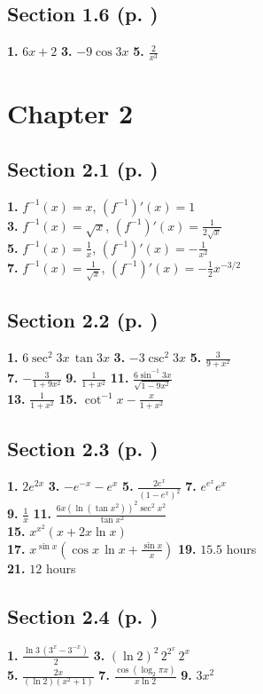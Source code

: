 \begin{multicols*}{2}
\subsection*{Section 1.6 (p. \pageref{sec1dot6})}
\textbf{1.} $6x+2$ \quad
\textbf{3.} $-9\cos 3x$ \quad
\textbf{5.} $\frac{2}{x^3}$
\section*{Chapter 2}
\subsection*{Section 2.1 (p. \pageref{sec2dot1})}
\textbf{1.} $f^{-1}(x)=x$, $\left(f^{-1}\right)'(x)=1$\\
\textbf{3.} $f^{-1}(x)=\sqrt{x}$, $\left(f^{-1}\right)'(x)=\frac{1}{2\sqrt{x}}$\\
\textbf{5.} $f^{-1}(x)=\frac{1}{x}$, $\left(f^{-1}\right)'(x)=-\frac{1}{x^2}$\\
\textbf{7.} $f^{-1}(x)=\frac{1}{\sqrt{x}}$, $\left(f^{-1}\right)'(x)=-\frac{1}{2}x^{-3/2}$
\subsection*{Section 2.2 (p. \pageref{sec2dot2})}
\textbf{1.} $6\sec^2 3x\,\tan 3x$ \quad
\textbf{3.} $-3\csc^2 3x$ \quad
\textbf{5.} $\frac{3}{9+x^2}$\\
\textbf{7.} $-\frac{3}{1+9x^2}$ \quad
\textbf{9.} $\frac{1}{1+x^2}$ \quad
\textbf{11.} $\frac{6\sin^{-1} 3x}{\sqrt{1-9x^2}}$\\
\textbf{13.} $\frac{1}{1+x^2}$ \quad
\textbf{15.} $\cot^{-1} x - \frac{x}{1+x^2}$
\subsection*{Section 2.3 (p. \pageref{sec2dot3})}
\textbf{1.} $2e^{2x}$ \quad
\textbf{3.} $-e^{-x} - e^x$ \quad
\textbf{5.} $\frac{2e^x}{(1-e^x)^2}$ \quad
\textbf{7.} $e^{e^x}e^x$\\
\textbf{9.} $\frac{1}{x}$ \quad
\textbf{11.} $\frac{6x\left(\ln\left(\tan x^2\right)\right)^2 \sec^2 x^2}{\tan x^2}$\\
\textbf{15.} $x^{x^2}(x+2x\ln x)$\\
\textbf{17.} $x^{\sin x}\left(\cos x \, \ln x + \frac{\sin x}{x}\right)$ \quad
\textbf{19.} $15.5$ hours\\
\textbf{21.} $12$ hours
\subsection*{Section 2.4 (p. \pageref{sec2dot4})}
\textbf{1.} $\frac{\ln 3\,\left(3^x - 3^{-x}\right)}{2}$ \quad
\textbf{3.} $(\ln 2)^2 \, 2^{2^x} \, 2^x$\\
\textbf{5.} $\frac{2x}{(\ln 2)(x^2+1)}$ \quad
\textbf{7.} $\frac{\cos\left(\log_2 \pi x\right)}{x \ln 2}$ \quad
\textbf{9.} $3x^2$

\end{multicols*}
